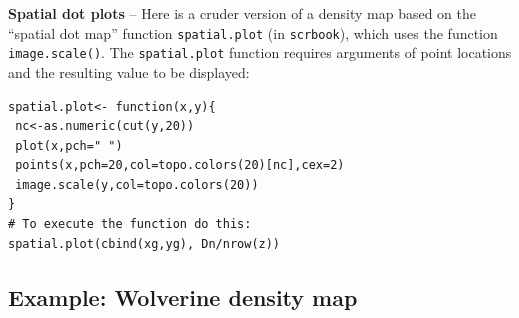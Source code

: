 {\bf Spatial dot plots } -- Here is a cruder version of a density map based on the
``spatial dot map'' function \mbox{\tt spatial.plot} (in
\mbox{\tt scrbook}), which uses
the function \mbox{\tt image.scale()}.
The \mbox{\tt spatial.plot} function requires arguments of point
locations and the resulting value to be displayed:
\begin{verbatim}
spatial.plot<- function(x,y){
 nc<-as.numeric(cut(y,20))
 plot(x,pch=" ")
 points(x,pch=20,col=topo.colors(20)[nc],cex=2)
 image.scale(y,col=topo.colors(20))
}
# To execute the function do this:
spatial.plot(cbind(xg,yg), Dn/nrow(z))
\end{verbatim}

\subsection{Example: Wolverine density map}

